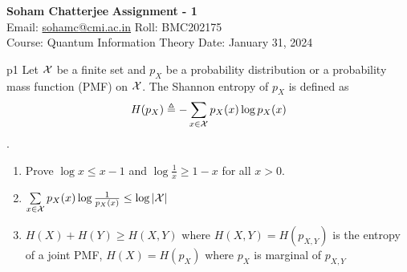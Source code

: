 \documentclass[a4paper, 11pt]{article}
\begin{document}
	
	
	\textsf{\noindent \large\textbf{Soham Chatterjee} \hfill \textbf{Assignment - 1}\\
		Email: \href{sohamc@cmi.ac.in}{sohamc@cmi.ac.in} \hfill Roll: BMC202175\\
		\normalsize Course: Quantum Information Theory \hfill Date: January 31, 2024}
	
	
	\begin{problem}{%
		}{p1%
		}
Let $\mathcal{X}$ be a finite		set and $p_X$ be a probability distribution or a probability mass function (PMF) on $\mathcal{X}$. The Shannon entropy of $p_X$ is defined as $$H(p_X)\triangleq -\sum_{x\in \mathcal{X}}p_X(x)\log p_X(x)$$.
\begin{enumerate}
	\item Prove $\log x\leq x-1$ and $\log \frac1x\geq 1-x$ for all $x>0$.
	\item $\sum\limits_{x\in \mathcal{X}}p_X(x)\log \frac1{p_X(x)}\leq \log |\mathcal{X}|$
	\item $H(X)+H(Y)\geq H(X,Y)$ where $H(X,Y)=H(p_{X,Y})$ is the entropy of a joint PMF, $H(X)=H(p_X)$ where $p_X$ is marginal of $p_{X,Y}$
\end{enumerate}
	\end{problem}
	
	
\end{document}
